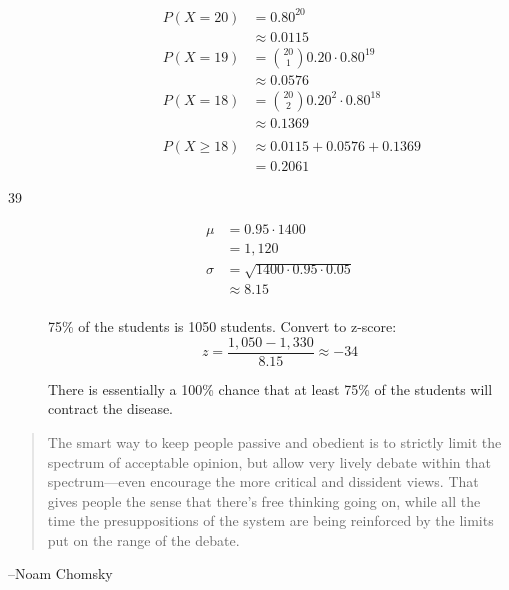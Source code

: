 \documentclass[letterpaper, landscape]{exam}
\begin{document}
\begin{description}
\begin{enumerate}[(a)]
            \begin{align*}
              P(X = 20) & = 0.80^{20} \\
                        & \approx 0.0115 \\
              P(X = 19) & = \binom{20}{1} 0.20 \cdot 0.80^{19} \\
                        & \approx 0.0576 \\
              P(X = 18) & = \binom{20}{2} 0.20^2 \cdot 0.80^{18} \\
                        & \approx 0.1369 \\
                       \\
              P(X \geq 18) & \approx 0.0115 + 0.0576 + 0.1369 \\
                           & = \boxed{ 0.2061 }
            \end{align*}

        \end{enumerate}

      \item[39]
        \begin{enumerate}[(a)]
          \begin{align*}
            \mu    & = 0.95 \cdot 1400 \\
                   & = 1,120 \\
            \sigma & = \sqrt{1400 \cdot 0.95 \cdot 0.05} \\
                   & \approx 8.15 \\
          \end{align*}

          75\% of the students is 1050 students. Convert to z-score:
          \[
            z = \frac{1,050 - 1,330}{8.15} \approx -34
          \]

          There is essentially a 100\% chance that at least 75\% of the
          students will contract the disease.

        \end{enumerate}
  \end{description}

  \else
    \vspace{7 cm}
    \begin{quote}
      \begin{em}
        The smart way to keep people passive and obedient is to strictly limit
        the spectrum of acceptable opinion, but allow very lively debate within
        that spectrum---even encourage the more critical and dissident views.
        That gives people the sense that there's free thinking going on, while
        all the time the presuppositions of the system are being reinforced by
        the limits put on the range of the debate.
      \end{em}
    \end{quote}
    \hspace{1 cm}--Noam Chomsky
  \fi
\end{document}
